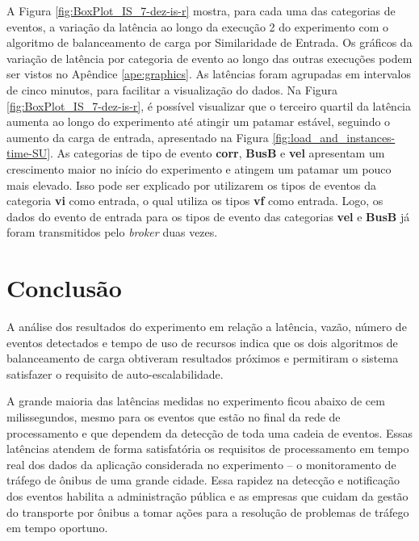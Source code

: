A Figura \ref{fig:BoxPlot_IS_7-dez-is-r} mostra, para cada uma das categorias de eventos, a variação da latência ao longo da execução 2 do experimento com o algoritmo de balanceamento de carga por Similaridade de Entrada. 
Os gráficos da variação de latência por categoria de evento ao longo das outras execuções podem ser vistos no Apêndice \ref{ape:graphics}.
As latências foram agrupadas em intervalos de cinco minutos, para facilitar a visualização do dados. Na Figura \ref{fig:BoxPlot_IS_7-dez-is-r}, é possível visualizar que o terceiro quartil da latência aumenta ao longo do experimento até atingir um patamar estável, seguindo o aumento da carga de entrada, apresentado na Figura \ref{fig:load_and_instances-time-SU}. As categorias de tipo de evento \textbf{corr}, \textbf{BusB} e \textbf{vel} apresentam um crescimento maior no início do experimento e atingem um patamar um pouco mais elevado. Isso pode ser explicado por utilizarem os tipos de eventos da categoria \textbf{vi} como entrada, o qual utiliza os tipos \textbf{vf} como entrada. Logo, os dados do evento de entrada para os tipos de evento das categorias \textbf{vel} e \textbf{BusB} já foram transmitidos pelo \textit{broker} duas vezes. %




\section{Conclusão}


A análise dos resultados do experimento em relação a latência, vazão, número de eventos detectados e tempo de uso de recursos indica que os dois algoritmos de balanceamento de carga obtiveram resultados próximos e permitiram o sistema satisfazer o requisito de auto-escalabilidade. 


A grande maioria das latências medidas no experimento ficou abaixo de cem milissegundos, mesmo para os eventos que estão no final da rede de processamento e que dependem da detecção de toda uma cadeia de eventos. 
Essas latências atendem de forma satisfatória os requisitos de processamento em tempo real dos dados da aplicação considerada no experimento -- o monitoramento de tráfego de ônibus de uma grande cidade. Essa rapidez na detecção e notificação dos eventos habilita a administração pública e as empresas que cuidam da gestão do transporte por ônibus a tomar ações para a resolução de problemas de tráfego em tempo oportuno. 
  
